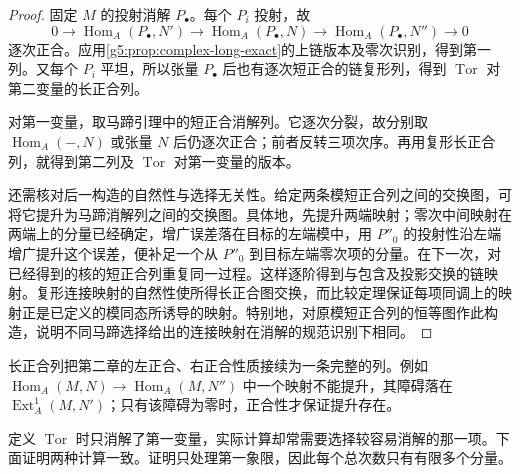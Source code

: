 \begin{proof}
	固定 \(M\) 的投射消解 \(P_\bullet\)。每个 \(P_i\) 投射，故
	\[
		0\to\operatorname{Hom}_A(P_\bullet,N')
		\to\operatorname{Hom}_A(P_\bullet,N)
		\to\operatorname{Hom}_A(P_\bullet,N'')\to0
	\]
	逐次正合。应用\cref{g5:prop:complex-long-exact}的上链版本及零次识别，得到第一列。又每个 \(P_i\) 平坦，所以张量 \(P_\bullet\) 后也有逐次短正合的链复形列，得到 \(\operatorname{Tor}\) 对第二变量的长正合列。

	对第一变量，取马蹄引理中的短正合消解列。它逐次分裂，故分别取 \(\operatorname{Hom}_A(-,N)\) 或张量 \(N\) 后仍逐次正合；前者反转三项次序。再用复形长正合列，就得到第二列及 \(\operatorname{Tor}\) 对第一变量的版本。

	还需核对后一构造的自然性与选择无关性。给定两条模短正合列之间的交换图，可将它提升为马蹄消解列之间的交换图。具体地，先提升两端映射；零次中间映射在两端上的分量已经确定，增广误差落在目标的左端模中，用 \(P''_0\) 的投射性沿左端增广提升这个误差，便补足一个从 \(P''_0\) 到目标左端零次项的分量。在下一次，对已经得到的核的短正合列重复同一过程。这样逐阶得到与包含及投影交换的链映射。复形连接映射的自然性使所得长正合图交换，而比较定理保证每项同调上的映射正是已定义的模同态所诱导的映射。特别地，对原模短正合列的恒等图作此构造，说明不同马蹄选择给出的连接映射在消解的规范识别下相同。
\end{proof}

长正合列把第二章的左正合、右正合性质接续为一条完整的列。例如 \(\operatorname{Hom}_A(M,N)\to\operatorname{Hom}_A(M,N'')\) 中一个映射不能提升，其障碍落在 \(\operatorname{Ext}^1_A(M,N')\)；只有该障碍为零时，正合性才保证提升存在。

\ProseParagraphBreak

定义 \(\operatorname{Tor}\) 时只消解了第一变量，实际计算却常需要选择较容易消解的那一项。下面证明两种计算一致。证明只处理第一象限，因此每个总次数只有有限多个分量。


